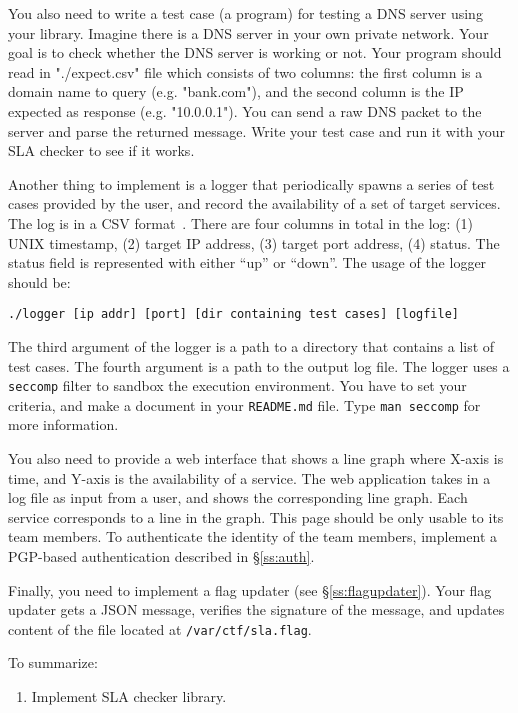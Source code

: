 \documentclass[a4paper, 11pt]{article}
\theoremstyle{definition}
\begin{document}
{You also need to write a test case (a program) for testing a DNS
server using your library. Imagine there is a DNS server in your own
private network. Your goal is to check whether the DNS server is
working or not. Your program should read in "./expect.csv" file which
consists of two columns: the first column is a domain name to query
(e.g. "bank.com"), and the second column is the IP expected as
response (e.g. "10.0.0.1"). You can send a raw DNS packet to the
server and parse the returned message. Write your test case and run it
with your SLA checker to see if it works.

Another thing to implement is a logger that periodically spawns a
series of test cases provided by the user, and record the availability
of a set of target services. The log is in a CSV
format~\cite{csvwiki}. There are four columns in total in the log: (1)
UNIX timestamp, (2) target IP address, (3) target port address, (4)
status. The status field is represented with either ``up'' or
``down''. The usage of the logger should be:
%
\begin{verbatim}
./logger [ip addr] [port] [dir containing test cases] [logfile]
\end{verbatim}
%
The third argument of the logger is a path to a directory that
contains a list of test cases. The fourth argument is a path to the
output log file. The logger uses a \texttt{seccomp} filter to sandbox
the execution environment. You have to set your criteria, and make a
document in your \texttt{README.md} file. Type \texttt{man seccomp}
for more information.

You also need to provide a web interface that shows a line graph where
X-axis is time, and Y-axis is the availability of a service. The web
application takes in a log file as input from a user, and shows the
corresponding line graph. Each service corresponds to a line in the
graph. This page should be only usable to its team members. To
authenticate the identity of the team members, implement a PGP-based
authentication described in \S\ref{ss:auth}.

Finally, you need to implement a flag updater (see
\S\ref{ss:flagupdater}). Your flag updater gets a JSON message,
verifies the signature of the message, and updates content of the file
located at \texttt{/var/ctf/sla.flag}.

To summarize:
\begin{enumerate}

  \item Implement SLA checker library.


\end{enumerate}}
\end{document}
